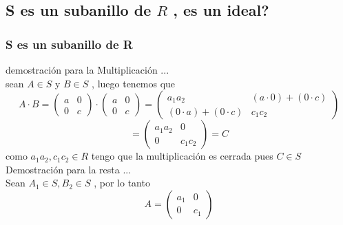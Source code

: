 \documentclass[10pt,a4paper]{article} %
\begin{document}
        \subsection{S es un subanillo de $ R  $   , es un ideal?}
            \subsubsection{S es un subanillo de R}
                demostración para la Multiplicación ...
                \\
                sean $ A \in S  $  y $ B \in S  $ , luego tenemos que
                \begin{equation}
                    A \cdot B = \begin{pmatrix}
                        a & 0
                        \\
                        0 & c
                    \end{pmatrix}
                    \cdot \begin{pmatrix}
                        a & 0
                        \\
                        0 & c
                    \end{pmatrix}
                    =
                    \begin{pmatrix}
                        a _1 a_2  & (a \cdot 0) + (0 \cdot c)
                        \\
                        (0 \cdot a) + (0 \cdot c) & c_1 c_2
                    \end{pmatrix}
                \end{equation}
                \begin{equation}
                     = \begin{pmatrix}
                        a_1 a_2  & 0
                        \\
                        0 & c_1 c_2
                    \end{pmatrix}
                    = C
                \end{equation}
                como $ a _1 a_2  , c_1c_2 \in R    $ tengo que la multiplicación es
                cerrada pues $ C \in S  $
                \\
                Demostración para la resta ...
                \\
                Sean $ A_1 \in S , B_2 \in S  $ , por lo tanto
                \begin{equation}
                    A = \begin{pmatrix}
                        a_1  & 0
                        \\
                        0 & c_1
                    \end{pmatrix}
                \end{equation}
\end{document}
